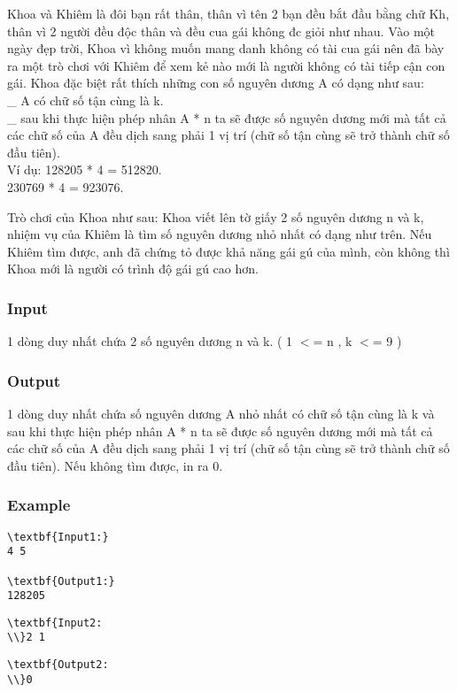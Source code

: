 



   Khoa và Khiêm là đôi bạn rất thân, thân vì tên 2 bạn đều bắt đầu bằng chữ Kh, thân vì 2 người đều độc thân và đều cua gái không đc giỏi như nhau. Vào một ngày đẹp trời, Khoa vì không muốn mang danh không có tài cua gái nên đã bày ra một trò chơi với Khiêm để xem kẻ nào mới là người không có tài tiếp cận con gái. Khoa đặc biệt rất thích những con số nguyên dương A có dạng như sau:   
\\   \_ A có chữ số tận cùng là k.   
\\   \_ sau khi thực hiện phép nhân A * n ta sẽ được số nguyên dương mới mà tất cả các chữ số của A đều dịch sang phải 1 vị trí (chữ số tận cùng sẽ trở thành chữ số đầu tiên).   
\\   Ví dụ:      128205 * 4 = 512820.   
\\   230769 * 4 = 923076.  

   Trò chơi của Khoa như sau: Khoa viết lên tờ giấy 2 số nguyên dương n và k, nhiệm vụ của Khiêm là tìm số nguyên dương nhỏ nhất có dạng như trên. Nếu Khiêm tìm được, anh đã chứng tỏ được khả năng gái gú của mình, còn không thì Khoa mới là người có trình độ gái gú cao hơn.  

\subsubsection{   Input  }

   1 dòng duy nhất chứa 2 số nguyên dương n và k. ( 1 $<$= n , k $<$= 9 )  

\subsubsection{   Output  }

   1 dòng duy nhất chứa số nguyên dương A nhỏ nhất có chữ số tận cùng là k và sau khi thực hiện phép nhân A * n ta sẽ được số nguyên dương mới mà tất cả các chữ số của A đều dịch sang phải 1 vị trí (chữ số tận cùng sẽ trở thành chữ số đầu tiên). Nếu không tìm được, in ra 0.  

\subsubsection{   Example  }
\begin{verbatim}
\textbf{Input1:}
4 5

\textbf{Output1:}
128205\end{verbatim}
\begin{verbatim}
\textbf{Input2:
\\}2 1\end{verbatim}
\begin{verbatim}
\textbf{Output2:
\\}0\end{verbatim}